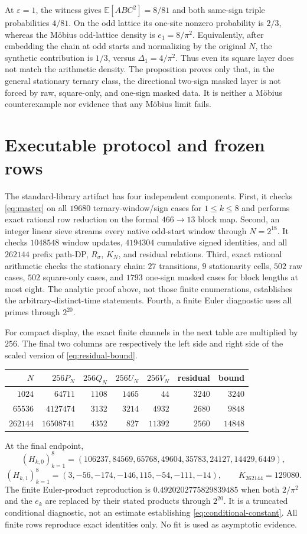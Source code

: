\documentclass[11pt]{article}
\theoremstyle{definition}
\theoremstyle{remark}
\newcommand{\E}{\mathbb E}
\begin{document}
At $\varepsilon=1$, the witness gives $\E[ABC^2]=8/81$ and both same-sign
triple probabilities $4/81$.  On the odd lattice its one-site nonzero
probability is $2/3$, whereas the M\"obius odd-lattice density is
$e_1=8/\pi^2$.  Equivalently, after embedding the chain at odd starts and
normalizing by the original $N$, the synthetic contribution is $1/3$,
versus $\Delta_1=4/\pi^2$.  Thus even its square layer does not match the
arithmetic density.  The proposition proves only that, in the
general stationary ternary class, the directional two-sign masked layer is
not forced by raw, square-only, and one-sign masked data.  It is neither a
M\"obius counterexample nor evidence that any M\"obius limit fails.

\section{Executable protocol and frozen rows}

The standard-library artifact has four independent components.  First, it
checks \eqref{eq:master} on all $19680$ ternary-window/sign cases for
$1\le k\le8$ and performs exact rational row reduction on the formal
$466\to13$ block map.  Second, an integer linear sieve streams every native
odd-start window through $N=2^{18}$.  It checks $1048548$ window updates,
$4194304$ cumulative signed identities, and all $262144$ prefix path-DP,
$R_\sigma$, $K_N$, and residual relations.  Third, exact rational arithmetic
checks the stationary chain: $27$ transitions, $9$ stationarity cells,
$502$ raw cases, $502$ square-only cases, and $1793$ one-sign masked cases
for block lengths at most eight.  The analytic proof above, not those finite
enumerations, establishes the arbitrary-distinct-time statements.  Fourth,
a finite Euler diagnostic uses all primes through $2^{20}$.

For compact display, the exact finite channels in the next table are
multiplied by $256$.  The final two columns are respectively the left side
and right side of the scaled version of \eqref{eq:residual-bound}.
\begin{center}
\small
\begin{tabular}{@{}rrrrrrr@{}}
\toprule
$N$ & $256P_N$ & $256Q_N$ & $256U_N$ & $256V_N$ & residual & bound\\
\midrule
$1024$ & $64711$ & $1108$ & $1465$ & $44$ & $3240$ & $3240$\\
$65536$ & $4127474$ & $3132$ & $3214$ & $4932$ & $2680$ & $9848$\\
$262144$ & $16508741$ & $4352$ & $827$ & $11392$ & $2560$ & $14848$\\
\bottomrule
\end{tabular}
\end{center}
At the final endpoint,
\[
 (H_{k,0})_{k=1}^8=
 (106237,84569,65768,49604,35783,24127,14429,6449),
\]
\[
 (H_{k,1})_{k=1}^8=(3,-56,-174,-146,115,-54,-111,-14),
 \qquad K_{262144}=129080.
\]
The finite Euler-product reproduction is
$0.4920202775829839485$ when both $2/\pi^2$ and the $e_k$ are replaced by
their stated products through $2^{20}$.  It is a truncated conditional
diagnostic, not an estimate establishing \eqref{eq:conditional-constant}.
All finite rows reproduce exact identities only.  No fit is used as
asymptotic evidence.
\end{document}
